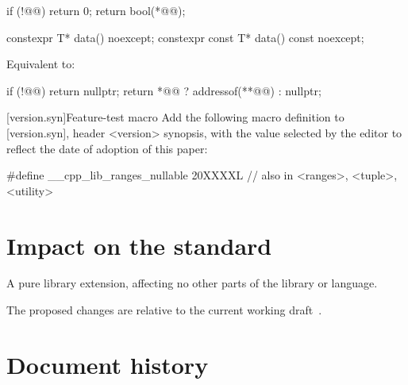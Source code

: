\documentclass[a4paper,10pt,oneside,openany,final,article]{memoir}
\begin{document}
\begin{wording}
\begin{itemdescr}
  \begin{codeblock}
    if (!@@)
      return 0;
    return bool(*@@);
  \end{codeblock}
\end{itemdescr}

\begin{itemdecl}
  constexpr T* data() noexcept;
  constexpr const T* data() const noexcept;
\end{itemdecl}

\begin{itemdescr}
\pnum{}
\effects{}
Equivalent to:
\begin{codeblock}
  if (!@@)
    return nullptr;
  return *@@ ? addressof(**@@) : nullptr;
\end{codeblock}
\end{itemdescr}

[version.syn]{Feature-test macro}
Add the following macro definition to [version.syn], header <version> synopsis, with the value selected by the editor to reflect the date of adoption of this paper:

\begin{codeblock}
  #define __cpp_lib_ranges_nullable 20XXXXL // also in <ranges>, <tuple>, <utility>
\end{codeblock}

\end{wording}

\chapter{Impact on the standard}

A pure library extension, affecting no other parts of the library or language.

The proposed changes are relative to the current working draft~\cite{N4958}.

\chapter*{Document history}
\end{document}

